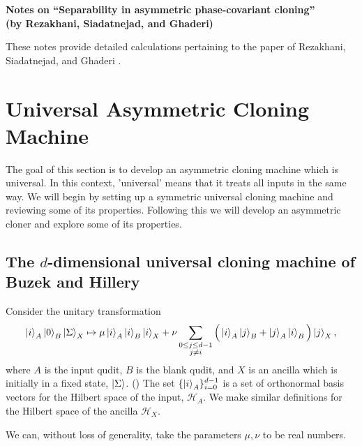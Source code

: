 \documentclass[reqno]{amsart}
\numberwithin{lemma}{section}
\numberwithin{proposition}{section}
\begin{document}
\begin{center}
\textbf{Notes on ``Separability in asymmetric phase-covariant cloning''}\\
\textbf{(by Rezakhani, Siadatnejad, and Ghaderi)}
\end{center}

These notes provide detailed calculations pertaining to the paper of Rezakhani, Siadatnejad, and Ghaderi \cite{REZAKHANI2005278}.

\section{Universal Asymmetric Cloning Machine}

The goal of this section is to develop an asymmetric cloning machine which is universal. In this context, 'universal' means that it treats all inputs in the same way. We will begin by setting up a symmetric universal cloning machine and reviewing some of its properties. Following this we will develop an asymmetric cloner and explore some of its properties.

\subsection{The $d$-dimensional universal cloning machine of Buzek and Hillery \cite{BuzekHillery1998}}

Consider the unitary transformation
\begin{equation}
\label{universal}
\ket{i}_{A} \ket{0}_{B} \ket{\Sigma}_{X} \mapsto \mu \ket{i}_{A} \ket{i}_{B} \ket{i}_{X} + \nu \sum_{\substack{0 \leq j \leq d-1\\ j \neq i}} \Big ( \ket{i}_{A} \ket{j}_{B} + \ket{j}_{A} \ket{i}_{B} \Big ) \ket{j}_{X},
\end{equation}
where $A$ is the input qudit, $B$ is the blank qudit, and $X$ is an ancilla which is initially in a fixed state, $\ket{\Sigma}$. ({\color{red}{RSG comment that the ancilla can be regarded as the cloning machine; I would like to understand this comment.}}) The set $\{\ket{i}_{A}\}_{i=0}^{d-1}$ is a set of orthonormal basis vectors for the Hilbert space of the input, $\mathcal{H}_{A}$. We make similar definitions for the Hilbert space of the ancilla $\mathcal{H}_{X}$. 

\smallskip

\begin{fact}
We can, without loss of generality, take the parameters $\mu, \nu$ to be real numbers.
\end{fact}
\end{document}
